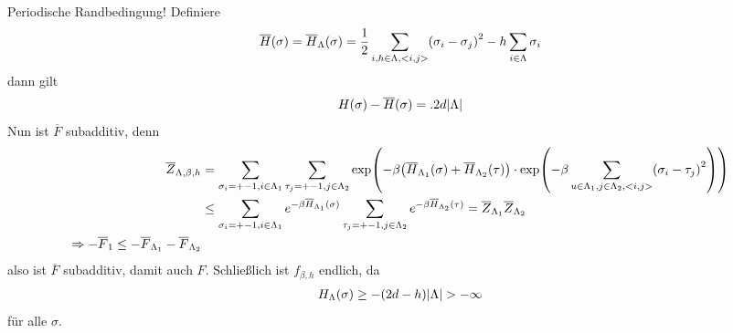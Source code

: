  \begin{beweis}
 	Periodische Randbedingung! Definiere
 	\begin{align}
 		\overline{H} (\sigma) = \overline{H}_{\Lambda}(\sigma) = \frac{1}{2} \sum\limits_{i,h \in \Lambda, <i,j>} \enb{\sigma_i - \sigma_j}^2 - h \sum\limits_{i \in \Lambda} \sigma_i
 	\end{align}
 	dann gilt 
 	\begin{align}
 		H(\sigma) - \overline{H}(\sigma) = .2d\lvert\Lambda\rvert
 	\end{align}
 	Nun ist $\overline{F}$ subadditiv, denn
 	\begin{align}
 		\overline{Z}_{\Lambda, \beta, h} &= \sum\limits_{\sigma_i = +- 1, i \in \Lambda_1} \sum\limits_{\tau_j = +-1, j \in \Lambda_2} \exp\enb{-\beta \enb{\overline{H}_{\Lambda_1}(\sigma) + \overline{H}_{\Lambda_2}(\tau)} \cdot \exp\enb{- \beta \sum\limits_{u \in \Lambda_1, j \in \Lambda_2, <i,j>} \enb{\sigma_i - \tau_j}^2 }  } \\
 		&\leq \sum\limits_{\sigma_i = +-1, i \in \Lambda_1} e^{-\beta \overline{H}_{\Lambda_1} (\sigma)} \sum\limits_{\tau_j = +-1, j \in \Lambda_2} e^{- \beta \overline{H}_{\Lambda_2}(\tau)} = \overline{Z}_{\Lambda_1} \overline{Z}_{\Lambda_2} \\
 		\Rightarrow - \overline{F}_1 \leq -\overline{F}_{\Lambda_1} - \overline{F}_{\Lambda_2}
 	\end{align}
 	also ist $\overline{F}$ subadditiv, damit auch $F$. Schließlich ist $f_{\beta, h}$ endlich, da 
 	\begin{align}
 		H_{\Lambda}(\sigma) \geq - \enb{2d - h} \abs{\Lambda} > - \infty
 	\end{align} für alle $\sigma$.
 \end{beweis}
 
